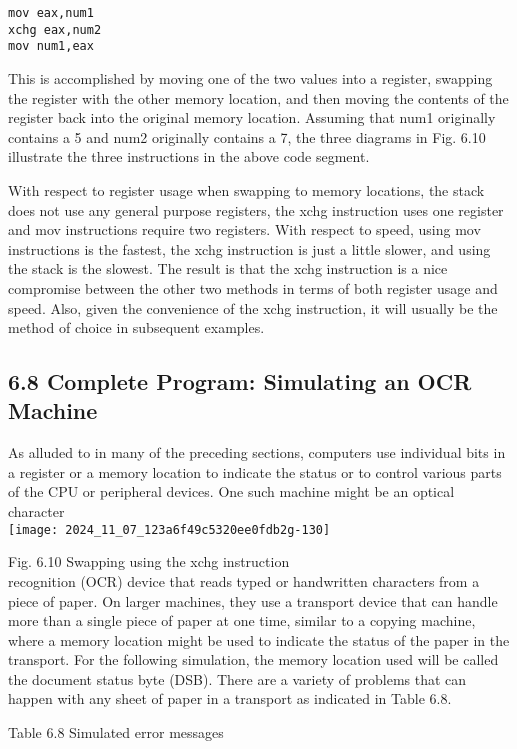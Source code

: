 \documentclass[10pt]{article}
\begin{document}
\begin{verbatim}
mov eax,num1
xchg eax,num2
mov num1,eax
\end{verbatim}

This is accomplished by moving one of the two values into a register, swapping the register with the other memory location, and then moving the contents of the register back into the original memory location. Assuming that num1 originally contains a 5 and num2 originally contains a 7, the three diagrams in Fig. 6.10 illustrate the three instructions in the above code segment.

With respect to register usage when swapping to memory locations, the stack does not use any general purpose registers, the xchg instruction uses one register and mov instructions require two registers. With respect to speed, using mov instructions is the fastest, the xchg instruction is just a little slower, and using the stack is the slowest. The result is that the xchg instruction is a nice compromise between the other two methods in terms of both register usage and speed. Also, given the convenience of the xchg instruction, it will usually be the method of choice in subsequent examples.

\subsection*{6.8 Complete Program: Simulating an OCR Machine}
As alluded to in many of the preceding sections, computers use individual bits in a register or a memory location to indicate the status or to control various parts of the CPU or peripheral devices. One such machine might be an optical character\\
\texttt{[image: 2024\_11\_07\_123a6f49c5320ee0fdb2g-130]}

Fig. 6.10 Swapping using the xchg instruction\\
recognition (OCR) device that reads typed or handwritten characters from a piece of paper. On larger machines, they use a transport device that can handle more than a single piece of paper at one time, similar to a copying machine, where a memory location might be used to indicate the status of the paper in the transport. For the following simulation, the memory location used will be called the document status byte (DSB). There are a variety of problems that can happen with any sheet of paper in a transport as indicated in Table 6.8.

Table 6.8 Simulated error messages
\end{document}
